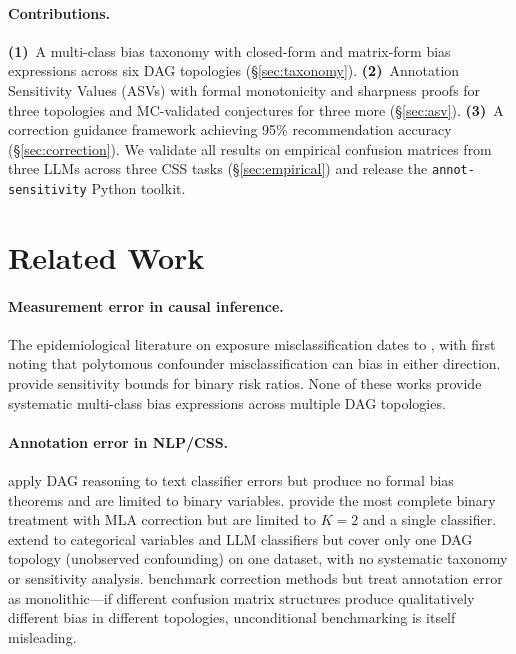 \documentclass[11pt]{article}
\begin{document}
\paragraph{Contributions.}
\textbf{(1)}~A multi-class bias taxonomy with closed-form and matrix-form bias expressions across six DAG topologies (\S\ref{sec:taxonomy}).
\textbf{(2)}~Annotation Sensitivity Values (ASVs) with formal monotonicity and sharpness proofs for three topologies and MC-validated conjectures for three more (\S\ref{sec:asv}).
\textbf{(3)}~A correction guidance framework achieving 95\% recommendation accuracy (\S\ref{sec:correction}).
We validate all results on empirical confusion matrices from three LLMs across three CSS tasks (\S\ref{sec:empirical}) and release the \texttt{annot-sensitivity} Python toolkit.


\section{Related Work}
\label{sec:related}

\paragraph{Measurement error in causal inference.}
The epidemiological literature on exposure misclassification dates to \citet{bross1954}, with \citet{brenner1993} first noting that polytomous confounder misclassification can bias in either direction.
\citet{vanderweele2019} provide sensitivity bounds for binary risk ratios.
None of these works provide systematic multi-class bias expressions across multiple DAG topologies.

\paragraph{Annotation error in NLP/CSS.}
\citet{wooddoughty2018} apply DAG reasoning to text classifier errors but produce no formal bias theorems and are limited to binary variables.
\citet{teblunthuis2024} provide the most complete binary treatment with MLA correction but are limited to $K\!=\!2$ and a single classifier.
\citet{lee2024} extend to categorical variables and LLM classifiers but cover only one DAG topology (unobserved confounding) on one dataset, with no systematic taxonomy or sensitivity analysis.
\citet{jerzak2025} benchmark correction methods but treat annotation error as monolithic---if different confusion matrix structures produce qualitatively different bias in different topologies, unconditional benchmarking is itself misleading.
\end{document}
